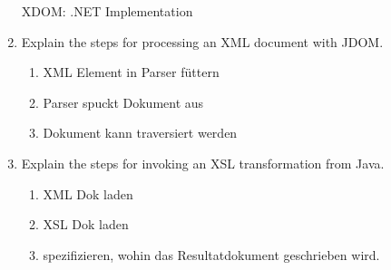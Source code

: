 \begin{enumerate}
XDOM: .NET Implementation
\item Explain the steps for processing an XML document with JDOM.\\
\begin{enumerate}
\item XML Element in Parser füttern
\item Parser spuckt Dokument aus
\item Dokument kann traversiert werden
\end{enumerate}
\item Explain the steps for invoking an XSL transformation from Java.\\
\begin{enumerate}
\item XML Dok laden
\item XSL Dok laden
\item spezifizieren, wohin das Resultatdokument geschrieben wird.
\end{enumerate}
\end{enumerate}

